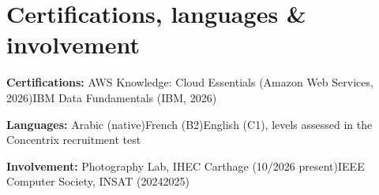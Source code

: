 \documentclass[10pt]{article}
\newcommand{\sep}{\enspace\textperiodcentered\enspace}
\begin{document}
\section{Certifications, languages \& involvement}
\textbf{Certifications:} AWS Knowledge: Cloud Essentials (Amazon Web Services, 2026)\sep IBM Data Fundamentals (IBM, 2026)\par
\textbf{Languages:} Arabic (native)\sep French (B2)\sep English (C1), levels assessed in the Concentrix recruitment test\par
\textbf{Involvement:} Photography Lab, IHEC Carthage (10/2026 \textendash{} present)\sep IEEE Computer Society, INSAT (2024\textendash{}2025)\par
\end{document}
